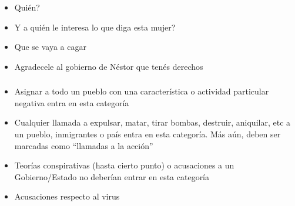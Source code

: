 \begin{displayquote}

    \begin{itemize}
        \item Quién?
        \item Y a quién le interesa lo que diga esta mujer?
        \item Que se vaya a cagar
        \item Agradecele al gobierno de Néstor que tenés derechos
    \end{itemize}

\end{displayquote}

\subsubsection{}


\begin{itemize}
    \item Asignar a todo un pueblo con una característica o actividad particular negativa entra en esta categoría
    \item Cualquier llamada a expulsar, matar, tirar bombas, destruir, aniquilar, etc a un pueblo, inmigrantes o país entra en esta categoría. Más aún, deben ser marcadas como ``llamadas a la acción''
    \item Teorías conspirativas (hasta cierto punto) o acusaciones a un Gobierno/Estado no deberían entrar en esta categoría
    \item Acusaciones respecto al virus
\end{itemize}





